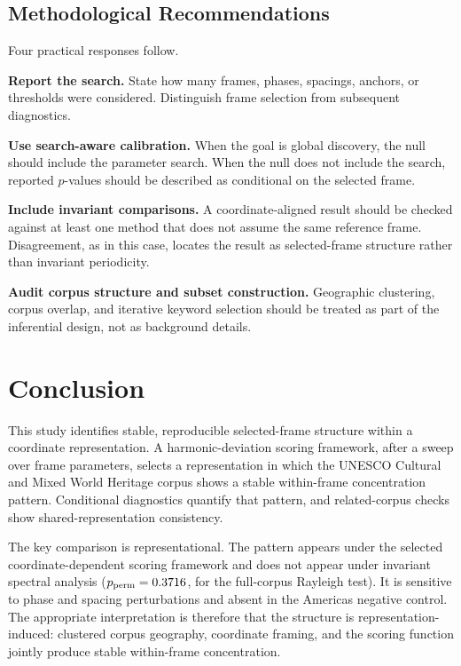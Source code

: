 \documentclass[12pt,a4paper]{article}
\begin{document}
\subsection{Methodological Recommendations}

Four practical responses follow.

\textbf{Report the search.} State how many frames, phases, spacings, anchors,
or thresholds were considered. Distinguish frame selection from subsequent
diagnostics.

\textbf{Use search-aware calibration.} When the goal is global discovery, the
null should include the parameter search. When the null does not include the
search, reported $p$-values should be described as conditional on the selected
frame.

\textbf{Include invariant comparisons.} A coordinate-aligned result should be
checked against at least one method that does not assume the same reference
frame. Disagreement, as in this case, locates the result as selected-frame
structure rather than invariant periodicity.

\textbf{Audit corpus structure and subset construction.} Geographic clustering,
corpus overlap, and iterative keyword selection should be treated as part of
the inferential design, not as background details.

\section{Conclusion}
\label{sec:conclusion}

This study identifies stable, reproducible selected-frame structure within a
coordinate representation. A harmonic-deviation scoring framework,
after a sweep over frame parameters, selects a representation in which the
UNESCO Cultural and Mixed World Heritage corpus shows a stable within-frame
concentration pattern. Conditional diagnostics quantify that pattern, and
related-corpus checks show shared-representation consistency.

The key comparison is representational. The pattern appears under the
selected coordinate-dependent scoring framework and does not appear under
invariant spectral analysis ($p_{\mathrm{perm}} = 0.3716$,
\fullRayleighPermPSig{} for the full-corpus Rayleigh test). It is sensitive
to phase and spacing perturbations and absent in the Americas negative
control. The appropriate interpretation is therefore that the structure is
representation-induced: clustered corpus geography, coordinate framing, and
the scoring function jointly produce stable within-frame concentration.
\end{document}

